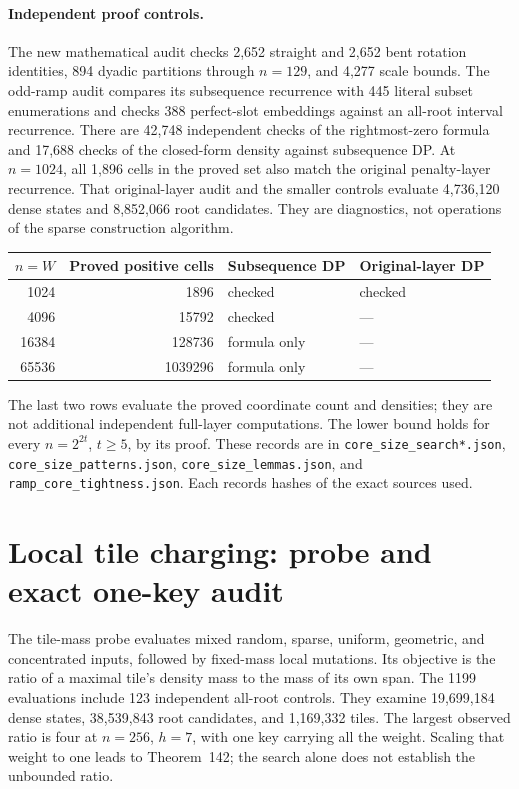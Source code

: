\documentclass[11pt]{article}
\begin{document}
\paragraph{Independent proof controls.}
The new mathematical audit checks 2,652 straight and 2,652 bent rotation
identities, 894 dyadic partitions through $n=129$, and 4,277 scale bounds.
The odd-ramp audit compares its subsequence recurrence with 445 literal
subset enumerations and checks 388 perfect-slot embeddings against an
all-root interval recurrence. There are 42,748 independent checks of the
rightmost-zero formula and 17,688 checks of the closed-form density against
subsequence DP. At $n=1024$, all 1,896 cells in the proved set also match
the original penalty-layer recurrence. That original-layer audit and the
smaller controls evaluate 4,736,120 dense states and 8,852,066 root candidates.
They are diagnostics, not operations of the sparse construction algorithm.

\begin{center}
\begin{tabular}{rrll}
\toprule
$n=W$ & Proved positive cells & Subsequence DP & Original-layer DP\\
\midrule
1024 & 1896 & checked & checked\\
4096 & 15792 & checked & ---\\
16384 & 128736 & formula only & ---\\
65536 & 1039296 & formula only & ---\\
\bottomrule
\end{tabular}
\end{center}
The last two rows evaluate the proved coordinate count and densities; they
are not additional independent full-layer computations. The lower bound
holds for every $n=2^{2t}$, $t\ge5$, by its proof. These records are in
\texttt{core\_size\_search*.json}, \texttt{core\_size\_patterns.json},
\texttt{core\_size\_lemmas.json}, and \texttt{ramp\_core\_tightness.json}.
Each records hashes of the exact sources used.

\section{Local tile charging: probe and exact one-key audit}
\label{app:local-tile}
The tile-mass probe evaluates mixed random, sparse, uniform, geometric,
and concentrated inputs, followed by fixed-mass local mutations. Its
objective is the ratio of a maximal tile's density mass to the mass of
its own span. The 1199 evaluations include 123 independent all-root
controls. They examine 19,699,184 dense states, 38,539,843 root candidates,
and 1,169,332 tiles. The largest observed ratio is four at $n=256$,
$h=7$, with one key carrying all the weight. Scaling that weight to one
leads to Theorem~142; the search alone does
not establish the unbounded ratio.
\end{document}
